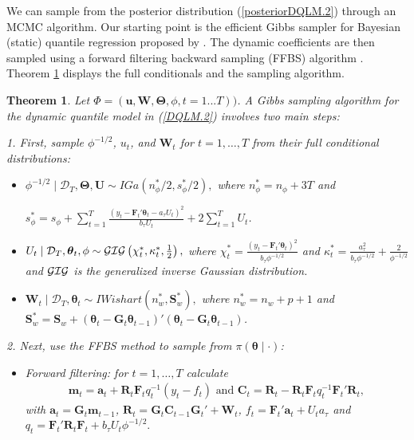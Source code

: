 \documentclass[12pt,a4paper]{article}\usepackage[]{graphicx}\usepackage[]{color}\usepackage{subfigure}
\newtheorem{myth}{Theorem}[section]
\newcommand{\bfFt}{\mathbf{F}_t}
\newcommand{\bfGt}{\mathbf{G}_t}
\newcommand{\bfWt}{\mathbf{W}_t}
\newcommand{\bftheta}{\boldsymbol{\theta}}
\newcommand{\bfTheta}{\boldsymbol{\Theta}}
\newcommand{\mathD}{\mathcal{D}}
\begin{document}
We can sample from the posterior distribution (\ref{posteriorDQLM.2}) through an MCMC algorithm. 
Our starting point is the efficient Gibbs sampler for Bayesian (static) quantile regression proposed by \cite{kozumi2011gibbs}.  
The dynamic coefficients are then sampled using a forward filtering backward sampling (FFBS) algorithm \cite{carter1994gibbs,fruhwirth1994data,shephard1994partial}. 
Theorem \ref{mcmc} displays the full conditionals and the sampling algorithm.  


\begin{myth}\label{mcmc}
 Let $\Phi=(\mathbf{u},\mathbf{W}, \bfTheta, \phi, t=1...T))$. A Gibbs sampling algorithm for the dynamic quantile model in (\ref{DQLM.2}) involves two main steps: 
\begin{description}
\item{1.} First,   sample  $\phi^{-1/2}$, $u_t$, and $\bfWt$ for $t=1,\dots,T$ from their full conditional distributions:
\begin{itemize}
 \item [(i)] $\phi^{-1/2} \mid \mathD_{T},\bfTheta,\mathbf{U} \sim IGa\left(n_{\phi}^*/2, s_{\phi}^*/2\right),$ where $n_{\phi}^* = n_{\phi} + 3T$ and 
 
 $s_{\phi}^* = s_{\phi} + \displaystyle\sum_{t=1}^{T}\frac{(y_t - \bfFt' \bftheta_t - a_\tau U_t)^2}{b_\tau U_t} + 2 \sum_{t=1}^{T} U_t$.
 
 \item [(ii)] $U_t\mid \mathD_{T},\bftheta_t,\phi \sim {\cal GIG}\left( \chi^*_t, \kappa^*_t,\frac{1}{2}\right),$ where $\chi_t^* = \frac{(y_t-\bfFt'\bftheta_t)^2}{b_\tau \phi^{-1/2}}$ and $\kappa_t^* = \frac{a_\tau^2}{b_\tau \phi^{-1/2}} + \frac{2}{\phi^{-1/2}}$
 and $\cal{GIG}$ is the generalized inverse Gaussian distribution.

 \item [(iii)] $ \bfWt \mid \mathD_{T},\bftheta_t \sim IWishart \left(n_w^*, \mathbf{S}_w^*\right),$ where 
$n_w^* = n_w + p + 1$ and $\mathbf{S}_w^* = \mathbf{S}_w + \left(\bftheta_t- \bfGt \bftheta_{t-1}\right)'\left(\bftheta_t- \bfGt \bftheta_{t-1}\right)$.
\end{itemize}
 
  
 \item{2.} Next, use the FFBS method to sample from $\pi(\bftheta \mid \cdot)$: 
\begin{itemize}
\item[(i)] Forward filtering: for $t=1,\dots,T$ calculate 
\begin{align*}
\mathbf{m}_t = \mathbf{a}_t + \mathbf{R}_t \bfFt q_t^{-1} (y_t - f_t) \mbox{ and } \mathbf{C}_t = \mathbf{R}_t - \mathbf{R}_t \bfFt q_t^{-1} \bfFt'  \mathbf{R}_t,
\end{align*}
with $\mathbf{a}_t = \bfGt \mathbf{m}_{t-1}$, 
$\mathbf{R}_t = \bfGt \mathbf{C}_{t-1} \bfGt' + \bfWt$, 
$f_t = \bfFt' \mathbf{a}_t + U_t a_\tau$ 
and
$q_t = \bfFt' \mathbf{R}_{t} \bfFt + b_\tau U_t \phi^{-1/2}.$



\end{itemize}
\end{description}
\end{myth}
\end{document}
